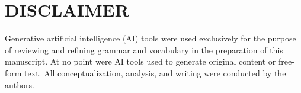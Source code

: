 \section{DISCLAIMER}
Generative artificial intelligence (AI) tools were used exclusively for the purpose of reviewing and refining grammar and vocabulary in the preparation of this manuscript. At no point were AI tools used to generate original content or free-form text. All conceptualization, analysis, and writing were conducted by the authors.